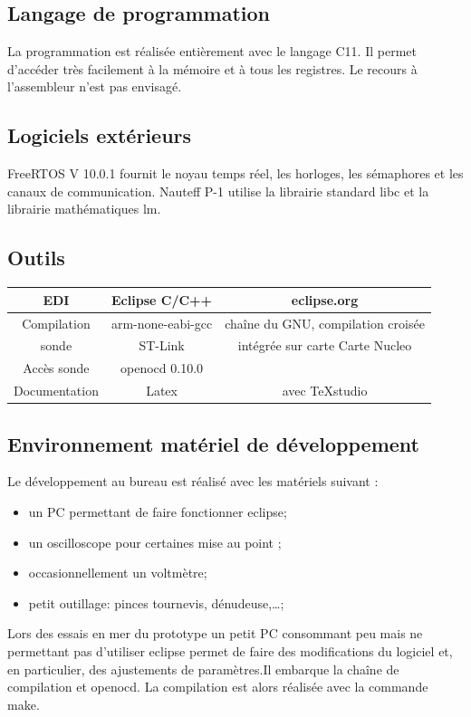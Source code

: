 \documentclass[a4paper,11pt]{report}
\begin{document}
\subsection{Langage de programmation}
La programmation est réalisée entièrement avec le langage C11.
Il permet d'accéder très facilement
à la mémoire et à tous les registres.
Le recours à l'assembleur n'est pas envisagé.

\subsection{Logiciels extérieurs}
FreeRTOS V 10.0.1 fournit le noyau temps réel, les horloges,
les sémaphores et les canaux de communication.
Nauteff P-1 utilise la librairie standard libc et la librairie mathématiques lm. 
\subsection{Outils}

\begin{tabular}{|c|c|c|}
	\hline 
	EDI& Eclipse C/C++ & eclipse.org    \\ 
	\hline 
	Compilation & arm-none-eabi-gcc & chaîne du GNU, compilation croisée \\ 
	\hline 
	sonde & ST-Link & intégrée sur carte Carte Nucleo   \\ 
	\hline 
	Accès sonde & openocd 0.10.0 &   \\ 
	\hline 
	Documentation & Latex &  avec TeXstudio\\
	\hline 
\end{tabular}

\subsection{Environnement matériel de développement}
Le développement au bureau est réalisé avec les matériels suivant :
\begin{itemize}
	\item un PC permettant de faire fonctionner eclipse;
	\item un oscilloscope pour certaines mise au point ;
	\item occasionnellement un voltmètre;
	\item petit outillage: pinces tournevis, dénudeuse,\ldots;
\end{itemize}
Lors des essais en mer du prototype un petit PC consommant peu
mais ne permettant pas d'utiliser eclipse permet de faire des
modifications du logiciel et, en particulier, des ajustements
de paramètres.Il embarque la chaîne de compilation et openocd.
La compilation est alors réalisée avec la commande make.
\end{document}

